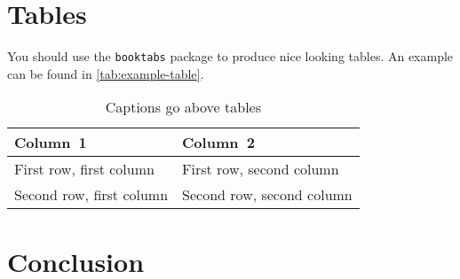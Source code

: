 \documentclass[10pt,journal,english,twocolumn]{IEEEtran} %
\begin{document}
\section{Tables}
You should use the \texttt{booktabs} package to produce nice looking tables.
An example can be found in \autoref{tab:example-table}.

\begin{table}
	\centering
	\caption{Captions go above tables}
	\label{tab:example-table}
	\begin{tabularx}{.97\linewidth}{XX}
		\toprule
		\textbf{Column~1} & \textbf{Column~2}\\
		\midrule
		First row, first column & First row, second column\\
		Second row, first column & Second row, second column\\
		\bottomrule
	\end{tabularx}
\end{table}


\section{Conclusion}\label{sec:conclusion}

\printbibliography[heading=bibintoc]
\end{document}
